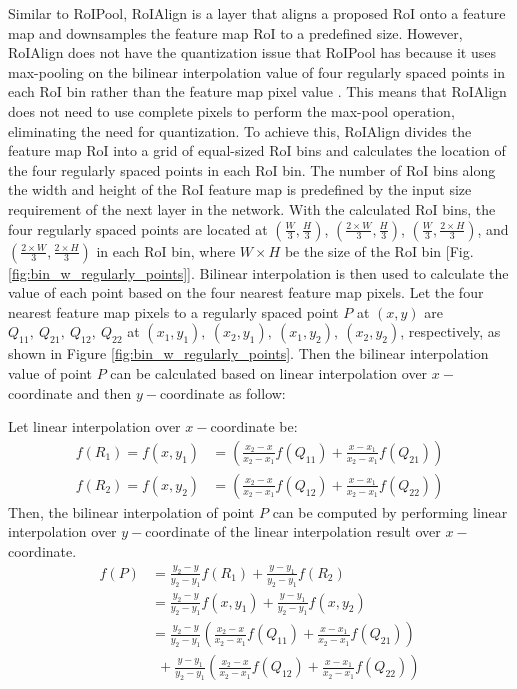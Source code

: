 Similar to RoIPool, RoIAlign is a layer that aligns a proposed RoI onto a feature map and downsamples the feature map RoI to a predefined size. However, RoIAlign does not have the quantization issue that RoIPool has because it uses max-pooling on the bilinear interpolation value of four regularly spaced points in each RoI bin rather than the feature map pixel value \cite{mask_rcnn_2017}. This means that RoIAlign does not need to use complete pixels to perform the max-pool operation, eliminating the need for quantization. To achieve this, RoIAlign divides the feature map RoI into a grid of equal-sized RoI bins and calculates the location of the four regularly spaced points in each RoI bin. The number of RoI bins along the width and height of the RoI feature map is predefined by the input size requirement of the next layer in the network. With the calculated RoI bins, the four regularly spaced points are located at $(\frac{W}{3}, \frac{H}{3})$, $(\frac{2 \times W}{3}, \frac{H}{3})$, $(\frac{W}{3}, \frac{2 \times H}{3})$, and $(\frac{2 \times W}{3}, \frac{2 \times H}{3})$ in each RoI bin, where $W \times H$ be the size of the RoI bin [Fig. \ref{fig:bin_w_regularly_points}]. Bilinear interpolation is then used to calculate the value of each point based on the four nearest feature map pixels. Let the four nearest feature map pixels to a regularly spaced point $P$ at $(x, y)$ are $Q_{11},\ Q_{21},\ Q_{12},\ Q_{22}$ at $(x_1, y_1),\ (x_2, y_1),\ (x_1, y_2),\ (x_2, y_2)$, respectively, as shown in Figure \ref{fig:bin_w_regularly_points}. Then the bilinear interpolation value of point $P$ can be calculated based on linear interpolation over $x-$coordinate and then $y-$coordinate as follow:

\relax
{}\relax
\noindent Let linear interpolation over $x-$coordinate be:
\begin{align*}
    f(R_1) = f(x, y_1) &= \left( \frac{x_2-x}{x_2-x_1}f(Q_{11}) + \frac{x-x_1}{x_2-x_1}f(Q_{21}) \right) \\
    f(R_2) = f(x, y_2) &= \left( \frac{x_2-x}{x_2-x_1}f(Q_{12}) + \frac{x-x_1}{x_2-x_1}f(Q_{22}) \right)
\end{align*}
\noindent Then, the bilinear interpolation of point $P$ can be computed by performing linear interpolation over $y-$coordinate of the linear interpolation result over $x-$coordinate. 
\begin{align}
    f(P) &= \frac{y_2-y}{y_2-y_1} f(R_1) + \frac{y-y_1}{y_2-y_1} f(R_2) \nonumber \\
    &= \frac{y_2-y}{y_2-y_1} f(x, y_1) + \frac{y-y_1}{y_2-y_1} f(x, y_2) \nonumber \\
    &= \frac{y_2-y}{y_2-y_1} \left( \frac{x_2-x}{x_2-x_1}f(Q_{11}) + \frac{x-x_1}{x_2-x_1}f(Q_{21}) \right) \nonumber \\
    &\ \ + \frac{y-y_1}{y_2-y_1} \left( \frac{x_2-x}{x_2-x_1}f(Q_{12}) + \frac{x-x_1}{x_2-x_1}f(Q_{22}) \right) \label{eq:binlinear_interpolation}
\end{align}
\relax
{}\relax

